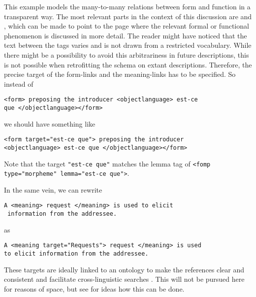 This example models the many-to-many relations between form and function in a transparent way. The most relevant parts in the context of this discussion are   and  , which can be made to point to the page where the relevant formal or functional phenomenon is discussed in more detail. The reader might have noticed that the text between the tags varies and is not drawn from a restricted vocabulary. While there might be a possibility to avoid this arbitrariness in future descriptions, this is not possible when retrofitting the schema on extant descriptions. Therefore, the precise target of the form-links and the meaning-links has to be specified. So instead of

\ea \begin{verbatim}<form> preposing the introducer <objectlanguage> est-ce
que </objectlanguage></form>\end{verbatim} \z

we should have something like

\ea \begin{verbatim}<form target="est-ce que"> preposing the introducer
<objectlanguage> est-ce que </objectlanguage></form>\end{verbatim} \z

Note that the target {\tt "est-ce que"} matches the lemma tag of \texttt{<fomp type="morpheme" lemma="est-ce que">}.

In the same vein, we can rewrite 

\ea \begin{verbatim}A <meaning> request </meaning> is used to elicit
 information from the addressee.\end{verbatim}\z

as
  
\ea \begin{verbatim}A <meaning target="Requests"> request </meaning> is used
to elicit information from the addressee.\end{verbatim}\z

These targets are ideally linked to an ontology to make the references clear and consistent and facilitate cross-linguistic searches \citep{FarrarEtAl2003}. This will not be pursued here for reasons of space, but see \citet{Good2004,Goodtv} for ideas how this can be done.

